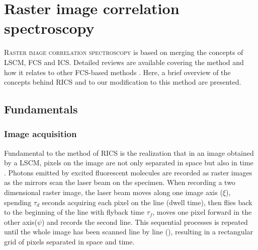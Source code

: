 \chapter{Raster image correlation spectroscopy}
\label{ch:rics}

\lettrine[lines=2, lhang=0.33, loversize=0.25]{R}{aster image
correlation spectroscopy} is based on merging the concepts of \ac{LSCM},
\ac{FCS} and \ac{ICS}\citep{Brown_08_JMicrosc_229_p78,Digman_05_BiophysJ_89_p1317}. 
Detailed reviews are available covering the method and how it
relates to other \ac{FCS}-based methods
\citep{Digman_11_AnnuRevPhysChem_62_p645,Haustein_07_AnnuRevBiophysBiomolStruct_36_p151}.
Here, a brief overview of the concepts behind \ac{RICS} and to
our modification to this method are presented.
\section{Fundamentals}
\subsection{Image acquisition}
Fundamental to the method of \acs{RICS} is the realization that in an image
obtained by a \ac{LSCM}, pixels on the image
are not only separated in space but also in time \citep{Digman_05_BiophysJ_89_p1317}. Photons emitted by
excited fluorescent molecules are recorded as raster images as the
mirrors scan the laser beam on the specimen.  
When recording a two dimensional raster image, the laser beam moves 
along one image axis ($\xi$), spending $\tau_d$ seconds acquiring each pixel on
the line (dwell time), then flies back to the beginning of the line with
flyback time $\tau_f$, moves one pixel forward in the other axis($\psi$) and records
the second line. This sequential processes is repeated until the whole
image has been scanned line by line (\F{~\ref{fig:rics_theory1}}),
resulting in a rectangular grid of pixels separated in space and time.

